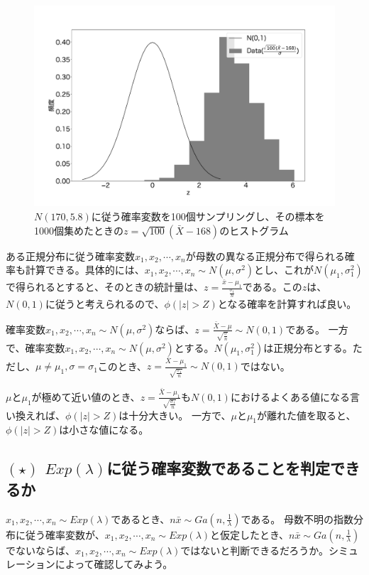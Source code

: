 \begin{figure}
    \begin{center}
        \includegraphics[width=15cm]{./image/02_/normal_distribution_test2.pdf}
        \caption{$N(170,5.8)$に従う確率変数を100個サンプリングし、その標本を1000個集めたときの$z=\sqrt{100}(\bar{X}-168)$のヒストグラム}
    \end{center}
\end{figure}


ある正規分布に従う確率変数$x_1,x_2,\cdots,x_n$が母数の異なる正規分布で得られる確率も計算できる。具体的には、$x_1,x_2,\cdots,x_n\sim N(\mu,\sigma^2)$とし、これが$N(\mu_1,\sigma_1^2)$で得られるとすると、そのときの統計量は、$z=\frac{\bar{x}-\mu_1}{\frac{\sigma_1}{n}}$である。この$z$は、$N(0,1)$に従うと考えられるので、$\phi(|z|>Z)$となる確率を計算すれば良い。

\begin{theo}
    確率変数$x_1,x_2,\cdots,x_n \sim N(\mu,\sigma^2)$ならば、$z=\frac{\bar{X}-\mu}{\sqrt{\frac{\sigma}{n}}} \sim N(0,1)$である。
    一方で、確率変数$x_1,x_2,\cdots,x_n \sim N(\mu,\sigma^2)$とする。$N(\mu_1,\sigma_1^2)$は正規分布とする。ただし、$\mu\neq \mu_1, \sigma =\sigma_1$このとき、$z=\frac{\bar{X}-\mu_1}{\sqrt{\frac{\sigma_1}{n}}} \sim N(0,1)$ではない。
\end{theo}
$\mu$と$ \mu_1$が極めて近い値のとき、$z=\frac{\bar{X}-\mu_1}{\sqrt{\frac{\sigma_1}{n}}} $も$N(0,1)$におけるよくある値になる言い換えれば、$\phi(|z|>Z)$は十分大きい。
一方で、$\mu$と$ \mu_1$が離れた値を取ると、$\phi(|z|>Z)$は小さな値になる。

\subsection{$(\star)$ $Exp(\lambda)$に従う確率変数であることを判定できるか}
$x_1,x_2,\cdots,x_n \sim Exp(\lambda)$であるとき、$n\bar{x}\sim Ga(n,\frac{1}{\lambda})$である。
母数不明の指数分布に従う確率変数が、$x_1,x_2,\cdots,x_n \sim Exp(\lambda)$と仮定したとき、$n\bar{x}\sim Ga(n,\frac{1}{\lambda})$でないならば、$x_1,x_2,\cdots,x_n \sim Exp(\lambda)$ではないと判断できるだろうか。シミュレーションによって確認してみよう。

